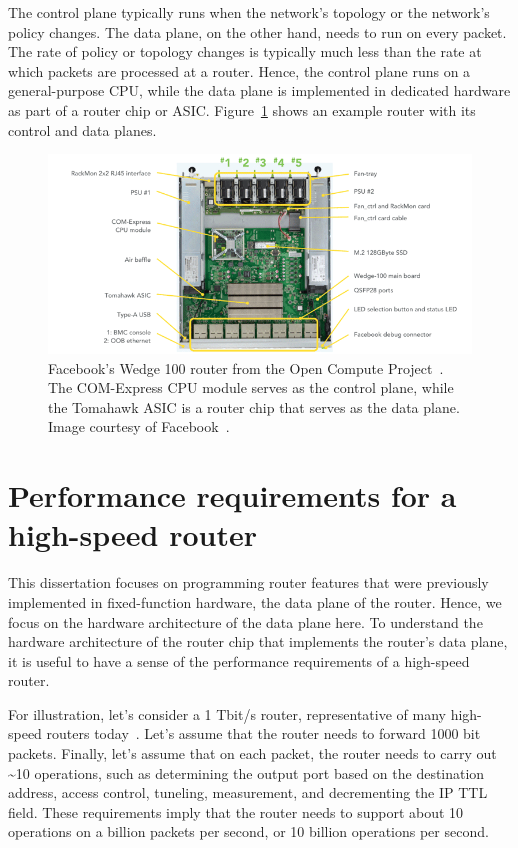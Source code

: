 The control plane typically runs when the network's topology or the network's
policy changes. The data plane, on the other hand, needs to run on every
packet. The rate of policy or topology changes is typically much less than the
rate at which packets are processed at a router. Hence, the control plane runs
on a general-purpose CPU, while the data plane is implemented in dedicated
hardware as part of a router chip or ASIC.  Figure~\ref{fig:router_box} shows
an example router with its control and data planes.

\begin{figure}
\centering
\includegraphics[width=\textwidth]{wedge100.png}
\caption{Facebook's Wedge 100 router from the Open Compute Project~\cite{ocp}.
The COM-Express CPU module serves as the control plane, while the Tomahawk ASIC
is a router chip that serves as the data plane. Image courtesy of
Facebook~\cite{wedge100}.}
\label{fig:router_box}
\end{figure}

\section{Performance requirements for a high-speed router}
This dissertation focuses on programming router features that were previously
implemented in fixed-function hardware, \ie the data plane of the router.
Hence, we focus on the hardware architecture of the data plane here.  To
understand the hardware architecture of the router chip that implements the
router's data plane, it is useful to have a sense of the performance
requirements of a high-speed router.

For illustration, let's consider a 1 Tbit/s router, representative of many
high-speed routers today~\cite{trident2, tomahawk, tomahawk2}. Let's assume
that the router needs to forward 1000 bit packets. Finally, let's assume that
on each packet, the router needs to carry out \textasciitilde10 operations,
such as determining the output port based on the destination address, access
control, tuneling, measurement, and decrementing the IP TTL field. These
requirements imply that the router needs to support about 10 operations on a
billion packets per second, or 10 billion operations per second.

